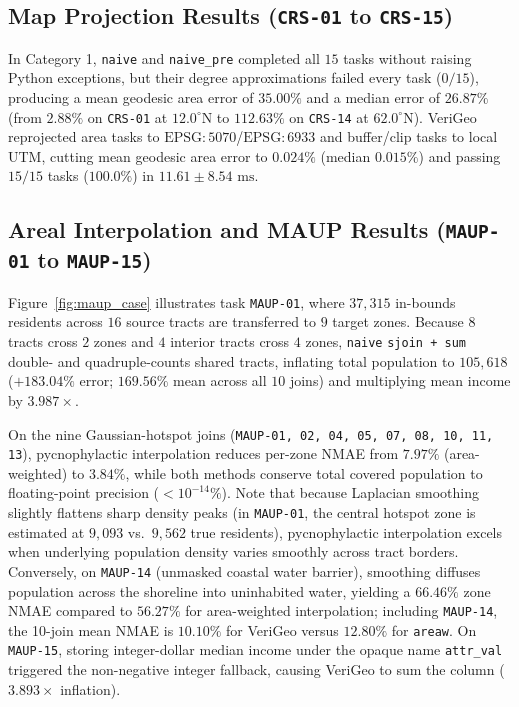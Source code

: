 \documentclass[10pt,twocolumn]{article}
\begin{document}
\subsection{Map Projection Results (\texttt{CRS-01} to \texttt{CRS-15})}
In Category 1, \texttt{naive} and \texttt{naive\_pre} completed all $15$ tasks without raising Python exceptions, but their degree approximations failed every task ($0/15$), producing a mean geodesic area error of $35.00\%$ and a median error of $26.87\%$ (from $2.88\%$ on \texttt{CRS-01} at $12.0^\circ\text{N}$ to $112.63\%$ on \texttt{CRS-14} at $62.0^\circ\text{N}$). VeriGeo reprojected area tasks to $\text{EPSG}:5070$/$\text{EPSG}:6933$ and buffer/clip tasks to local UTM, cutting mean geodesic area error to $0.024\%$ (median $0.015\%$) and passing $15/15$ tasks ($100.0\%$) in $11.61 \pm 8.54\text{ ms}$.

\subsection{Areal Interpolation and MAUP Results (\texttt{MAUP-01} to \texttt{MAUP-15})}
Figure~\ref{fig:maup_case} illustrates task \texttt{MAUP-01}, where $37,315$ in-bounds residents across $16$ source tracts are transferred to $9$ target zones. Because $8$ tracts cross $2$ zones and $4$ interior tracts cross $4$ zones, \texttt{naive} \texttt{sjoin + sum} double- and quadruple-counts shared tracts, inflating total population to $105,618$ ($+183.04\%$ error; $169.56\%$ mean across all $10$ joins) and multiplying mean income by $3.987\times$.

On the nine Gaussian-hotspot joins (\texttt{MAUP-01, 02, 04, 05, 07, 08, 10, 11, 13}), pycnophylactic interpolation reduces per-zone NMAE from $7.97\%$ (area-weighted) to $\mathbf{3.84\%}$, while both methods conserve total covered population to floating-point precision ($< 10^{-14}\%$). Note that because Laplacian smoothing slightly flattens sharp density peaks (in \texttt{MAUP-01}, the central hotspot zone is estimated at $9,093$ vs.\ $9,562$ true residents), pycnophylactic interpolation excels when underlying population density varies smoothly across tract borders. Conversely, on \texttt{MAUP-14} (unmasked coastal water barrier), smoothing diffuses population across the shoreline into uninhabited water, yielding a $66.46\%$ zone NMAE compared to $56.27\%$ for area-weighted interpolation; including \texttt{MAUP-14}, the 10-join mean NMAE is $10.10\%$ for VeriGeo versus $12.80\%$ for \texttt{areaw}. On \texttt{MAUP-15}, storing integer-dollar median income under the opaque name \texttt{attr\_val} triggered the non-negative integer fallback, causing VeriGeo to sum the column ($3.893\times$ inflation).
\end{document}
